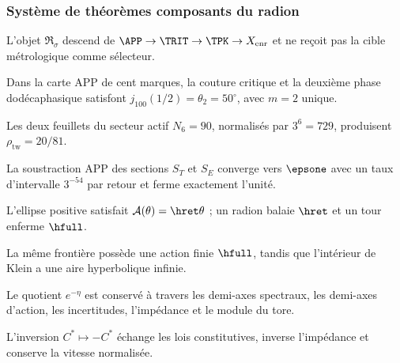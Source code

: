 \subsubsection{Système de théorèmes composants du radion}

\begin{theorem}[Généalogie]
L'objet \(\mathfrak R_\sigma\) descend de
\(\APP\to\TRIT\to\TPK\to X_{\mathrm{enr}}\) et ne reçoit pas la cible métrologique
comme sélecteur.
\end{theorem}

\begin{theorem}[Charnière]
Dans la carte APP de cent marques, la couture critique et la deuxième phase
dodécaphasique satisfont \(j_{100}(1/2)=\theta_2=50^\circ\), avec \(m=2\) unique.
\end{theorem}

\begin{theorem}[Densité]
Les deux feuillets du secteur actif \(N_6=90\), normalisés par \(3^6=729\),
produisent \(\rho_{\mathrm{tw}}=20/81\).
\end{theorem}

\begin{theorem}[Retenue]
La soustraction APP des sections \(S_T\) et \(S_E\) converge vers
\(\epsone\) avec un taux d'intervalle \(3^{-54}\) par retour et ferme exactement
l'unité.
\end{theorem}

\begin{theorem}[Action]
L'ellipse positive satisfait \(\mathcal A(\theta)=\hret\theta\) ; un radion
balaie \(\hret\) et un tour enferme \(\hfull\).
\end{theorem}

\begin{theorem}
La même frontière possède une action finie \(\hfull\), tandis que l'intérieur de
Klein a une aire hyperbolique infinie.
\end{theorem}

\begin{theorem}[Forme]
Le quotient \(e^{-\eta}\) est conservé à travers les demi-axes spectraux,
les demi-axes d'action, les incertitudes, l'impédance et le module du tore.
\end{theorem}

\begin{theorem}[Polarité]
L'inversion \(C^*\mapsto-C^*\) échange les lois constitutives, inverse
l'impédance et conserve la vitesse normalisée.
\end{theorem}

